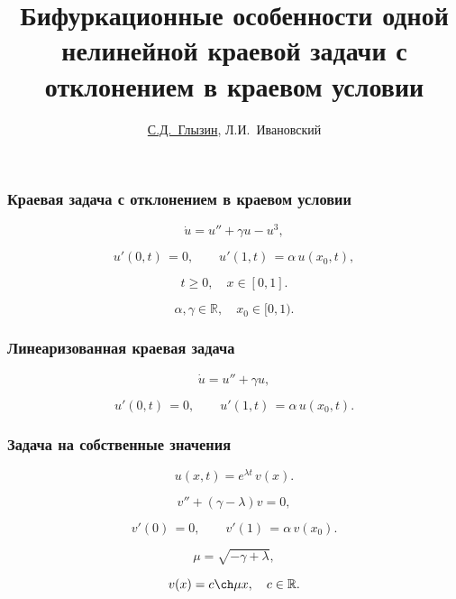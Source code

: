 \documentclass[fullscreen=true, unicode, bookmarks=false]{beamer}
\title[]{ {\huge Бифуркационные особенности одной нелинейной краевой задачи с отклонением в краевом условии } }
\author[]{{\large \underline{С.Д.~Глызин}, Л.И.~Ивановский}}
\date{ }
\institute[]
{ ЯрГУ им. П.Г. Демидова }
\begin{document}
\begin{frame}
\titlepage
\end{frame} 

\begin{frame}
\frametitle{ Краевая задача с отклонением в краевом условии }
 
\begin{equation}
	\dot u = u'' + \gamma u - u^3,	
\end{equation}

\begin{equation}
	u'(0, t) \, = 0, \qquad u'(1, t) \, = \alpha\,u(x_0, t),
\end{equation}

\bigskip

$$ t \geqslant 0, \quad x \in [0,1]. $$


$$ \alpha, \gamma \in \mathbb{R}, \quad x_0 \in [0, 1). $$

\end{frame}

\begin{frame}
\frametitle{ Линеаризованная краевая задача }
 
\begin{equation}
	\dot u = u'' + \gamma u,	
\end{equation}

\begin{equation}	
	u'(0, t) \, = 0, \qquad u'(1, t) \, = \alpha\,u(x_0, t).
\end{equation}

\end{frame}

\begin{frame}
\frametitle{ Задача на собственные значения }
 
$$ u(x, t) = e^{\lambda t} \, v(x). $$

\bigskip
 
\begin{equation}
	v'' + (\gamma - \lambda)v = 0,	
\end{equation}

\begin{equation}	
	v'(0) \, = 0, \qquad v'(1) \, = \alpha\,v(x_0).
\end{equation}

\bigskip

$$ \mu = \sqrt{-\gamma + \lambda}, $$

$$ v(x) = c \ch  \mu x, \quad c \in \mathbb{R}. $$

\end{frame}
\end{document}
